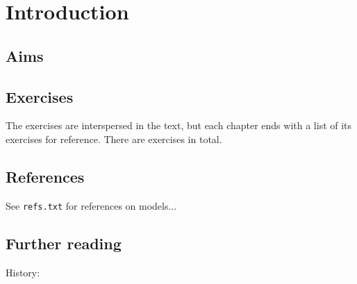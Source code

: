 \chapter{Introduction}

\section{Aims}

\section{Exercises}

The exercises are interspersed in the text, but each chapter ends with a list of
its exercises for reference.
%
There are  exercises in total.

\section{References}

\cite{Kleene1945}
\cite{Bauer2023}\cite{vanOosten2008}
\cite{Hyland1982}\cite{HJP1980}\cite{Pitts1981}
\cite{Bauer2006}
\cite{Streicher2018}

See \verb|refs.txt| for references on models...

\section{Further reading}

\cite{Chhabra2023}
\cite{LongleyNormann2015}
\cite{Longley1995}

History: \cite{Troelstra1998,vanOosten2002}

